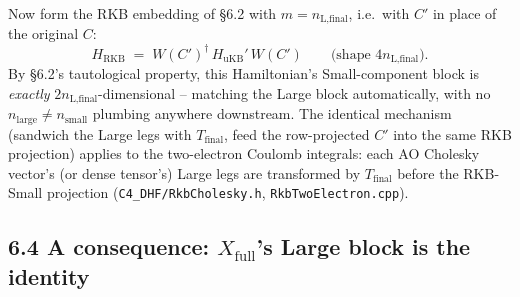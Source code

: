 \documentclass[11pt]{article}
\begin{document}
Now form the RKB embedding of \S6.2 with $m=n_{\text{L,final}}$, i.e.\ with $C'$ in place of the
original $C$:
\begin{equation}
H_{\text{RKB}} \;=\; W(C')^{\dagger}\,H_{\text{uKB}}'\,W(C')
\qquad\big(\text{shape } 4n_{\text{L,final}}\big).
\end{equation}
By \S6.2's tautological property, this Hamiltonian's Small-component block is \emph{exactly}
$2n_{\text{L,final}}$-dimensional -- matching the Large block automatically, with no
$n_{\text{large}}\ne n_{\text{small}}$ plumbing anywhere downstream. The identical mechanism
(sandwich the Large legs with $T_{\text{final}}$, feed the row-projected $C'$ into the same RKB
projection) applies to the two-electron Coulomb integrals: each AO Cholesky vector's (or dense
tensor's) Large legs are transformed by $T_{\text{final}}$ before the RKB-Small projection
(\texttt{C4\_DHF/RkbCholesky.h}, \texttt{RkbTwoElectron.cpp}).

\subsection*{6.4 A consequence: $X_{\text{full}}$'s Large block is the identity}
\end{document}
